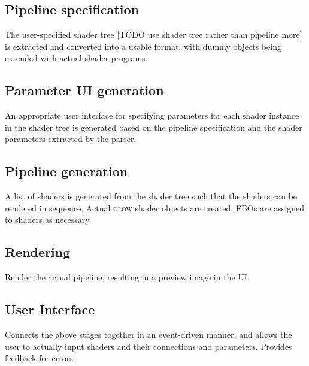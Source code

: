 \documentclass[12pt,twoside,notitlepage]{report}
\begin{document}
\subsection*{Pipeline specification}
The user-specified shader tree [TODO use shader tree rather than pipeline more] is extracted and converted into a usable format, with dummy objects being extended with actual shader programs.
\subsection*{Parameter UI generation}
An appropriate user interface for specifying parameters for each shader instance in the shader tree is generated based on the pipeline specification and the shader parameters extracted by the parser.
\subsection*{Pipeline generation}
A list of shaders is generated from the shader tree such that the shaders can be rendered in sequence. Actual \textsc{glow} shader objects are created. FBOs are assigned to shaders as necessary.
\subsection*{Rendering}
Render the actual pipeline, resulting in a preview image in the UI.
\subsection*{User Interface}
Connects the above stages together in an event-driven manner, and allows the user to actually input shaders and their connections and parameters. Provides feedback for errors.
\end{document}
